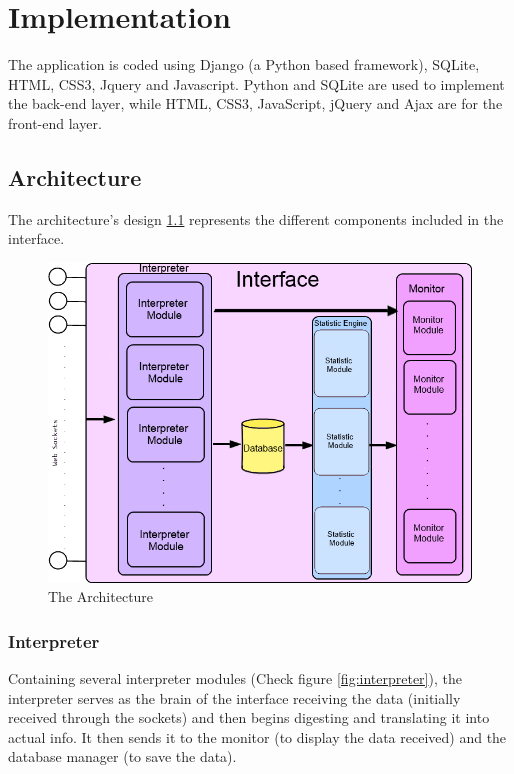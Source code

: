\chapter{Implementation}\label{chap:implementation}
The application is coded using Django (a Python based framework), SQLite, HTML, CSS3, Jquery and Javascript. Python and SQLite are used to implement the back-end layer, while HTML, CSS3, JavaScript, jQuery and Ajax are for the front-end layer.

\section{Architecture}
The architecture's design \ref{fig:architecture} represents the different components included in the interface.

\begin{figure}[htbp]
\centering 
\includegraphics[width=1.0\linewidth]{Interface} 
\caption{The Architecture} 
\label{fig:architecture} 
\end{figure}

\subsection{Interpreter}\label{sec:interpreter}
Containing several interpreter modules (Check figure \ref{fig:interpreter}), the interpreter serves as the brain of the interface receiving the data (initially received through the sockets) and then begins digesting and translating it into actual info. It then sends it to the monitor (to display the data received) and the database manager (to save the data).

